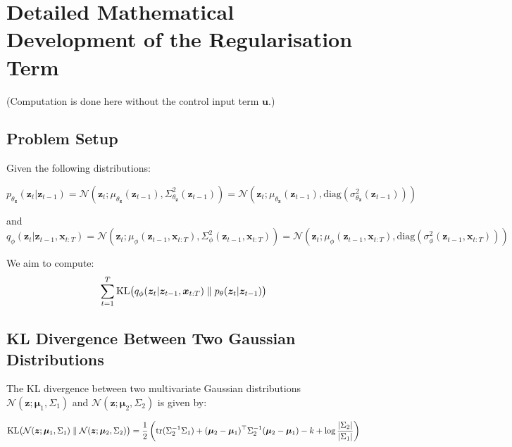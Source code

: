 \section{Detailed Mathematical Development of the Regularisation Term}
\label{sec:elbo_regularization}
(Computation is done here without the control input term $\bm{u}$.)
%
\subsection*{Problem Setup}

Given the following distributions:

\begin{equation*}
    p_{\theta_{\bm{z}}}(\bm{z}_t | \bm{z}_{t-1}) 
    = 
    \mathcal{N}(\bm{z}_t; 
    \mu_{\theta_{\bm{z}}}(\bm{z}_{t-1}), 
    \Sigma^2_{\theta_{\bm{z}}}(\bm{z}_{t-1}))
    =
    \mathcal{N}(\bm{z}_t; 
    \mu_{\theta_{\bm{z}}}(\bm{z}_{t-1}), 
    \text{diag}(\sigma^2_{\theta_{\bm{z}}}(\bm{z}_{t-1})))
\end{equation*}

and
\begin{equation*}
    q_{\phi}(\bm{z}_t | \bm{z}_{t-1}, \bm{x}_{t:T}) 
    = 
    \mathcal{N}(\bm{z}_t; \mu_{\phi}(\bm{z}_{t-1}, \bm{x}_{t:T}), 
    \Sigma^2_{\phi}(\bm{z}_{t-1}, \bm{x}_{t:T}))
    =
    \mathcal{N}(\bm{z}_t; \mu_{\phi}(\bm{z}_{t-1}, \bm{x}_{t:T}), 
    \text{diag}(\sigma^2_{\phi}(\bm{z}_{t-1}, \bm{x}_{t:T})))
\end{equation*}

We aim to compute:
%
\begin{equation*}
    \sum_{t=1}^T 
    \mathrm{KL}
    \big(
    q_\phi(\bm{z}_t | \bm{z}_{t-1}, \bm{x}_{t:T})
    \parallel
    p_\theta(\bm{z}_t | \bm{z}_{t-1})
    \big)
\end{equation*}

\subsection*{KL Divergence Between Two Gaussian Distributions}

The KL divergence between two multivariate Gaussian distributions
$ \mathcal{N}(\bm{z}; \bm{\mu}_1, \Sigma_1) $ and 
$ \mathcal{N}(\bm{z}; \bm{\mu}_2, \Sigma_2) $ is given by:

\begin{equation*}
\mathrm{KL} \big( \mathcal{N}(\bm{z}; \bm{\mu}_1, \Sigma_1) 
\parallel \mathcal{N}(\bm{z}; \bm{\mu}_2, \Sigma_2) \big) = 
\frac{1}{2} \left( \text{tr}(\Sigma_2^{-1} \Sigma_1) + 
(\bm{\mu}_2 - \bm{\mu}_1)^\top \Sigma_2^{-1} (\bm{\mu}_2 - \bm{\mu}_1) 
- k + \log \frac{|\Sigma_2|}{|\Sigma_1|} \right)
\end{equation*}

